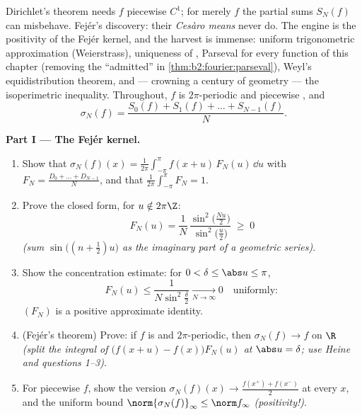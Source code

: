 \begin{problem}\label{pb:b2:fourier:1}
Dirichlet's theorem needs $f$ piecewise $C^1$; for merely
 $f$ the partial sums $S_N(f)$ can misbehave. Fej\'er's
discovery: their \emph{Ces\`aro means} never do. The engine is
the positivity of the Fej\'er kernel, and the harvest is
immense: uniform trigonometric approximation (Weierstrass),
uniqueness of , Parseval for every function
of this chapter (removing the ``admitted'' in
\cref{thm:b2:fourier:parseval}), Weyl's equidistribution
theorem, and --- crowning a century of geometry --- the
isoperimetric inequality.
Throughout, $f$ is $2\pi$-periodic and piecewise ,
and
\[
\sigma_N(f) = \frac{S_0(f) + S_1(f) + \dots +
S_{N-1}(f)}{N} .
\]

\medskip
\noindent\textbf{Part I --- The Fej\'er kernel.}
\begin{enumerate}
  \item Show that $\sigma_N(f)(x) =
        \frac{1}{2\pi}\int_{-\pi}^{\pi}f(x+u)\,F_N(u)\,\dd u$
        with $F_N = \frac{D_0 + \dots + D_{N-1}}{N}$, and
        that $\frac{1}{2\pi}\int_{-\pi}^{\pi}F_N = 1$.
  \item Prove the closed form, for $u \notin 2\pi\Z$:
        \[
        F_N(u) = \frac{1}{N}\,
        \frac{\sin^2\bigl(\frac{Nu}{2}\bigr)}
        {\sin^2\bigl(\frac u2\bigr)} \;\geq\; 0
        \]
        \emph{(sum $\sin\bigl((n+\frac12)u\bigr)$ as the
        imaginary part of a geometric series)}.
  \item Show the concentration estimate: for $0 < \delta \leq
        \abs u \leq \pi$,
        \[
        F_N(u) \leq \frac{1}{N\sin^2\frac\delta2}
        \xrightarrow[N\to\infty]{} 0
        \quad\text{uniformly} :
        \]
        $(F_N)$ is a positive approximate identity.
  \item (Fej\'er's theorem) Prove: if $f$ is  and
        $2\pi$-periodic, then $\sigma_N(f) \to f$
        \emph{} on $\R$ \emph{(split the integral of
        $\bigl(f(x+u) - f(x)\bigr)F_N(u)$ at $\abs u =
        \delta$; use Heine and questions 1--3)}.
  \item For piecewise  $f$, show the 
        version $\sigma_N(f)(x) \to \frac{f(x^+) +
        f(x^-)}{2}$ at every $x$, and the uniform bound
        $\norm{\sigma_N(f)}_\infty \leq \norm f_\infty$
        \emph{(positivity!)}.
\end{enumerate}


\end{problem}
